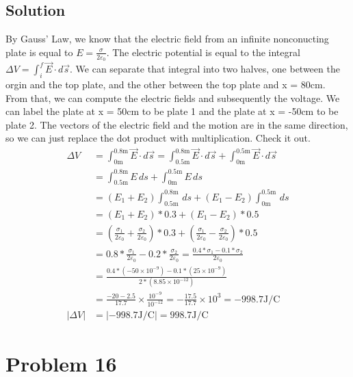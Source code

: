 \documentclass[12pt]{article}
\begin{document}
\subsection*{Solution}
By Gauss' Law, we know that the electric field from an infinite nonconucting plate is equal to $E = \frac{\sigma}{2\varepsilon_0}$.
The electric potential is equal to the integral $\Delta V = \int_{i}^{f} \vec{E}\cdot d\vec{s}$.
We can separate that integral into two halves, one between the orgin and the top plate, and the other between the top plate and x = 80cm.
From that, we can compute the electric fields and subsequently the voltage.
We can label the plate at x = 50cm to be plate 1 and the plate at x = -50cm to be plate 2.
The vectors of the electric field and the motion are in the same direction, so we can just replace the dot product with multiplication.
Check it out.
\begin{align*}
    \Delta V    &=  \int_{0\unit{\meter}}^{0.8\unit{\meter}} \vec{E} \cdot d\vec{s}
        =   \int_{0.5\unit{\meter}}^{0.8\unit{\meter}} \vec{E} \cdot d\vec{s} + \int_{0\unit{\meter}}^{0.5\unit{\meter}} \vec{E} \cdot d\vec{s}\\
        &=  \int_{0.5\unit{\meter}}^{0.8\unit{\meter}} E \,ds + \int_{0\unit{\meter}}^{0.5\unit{\meter}} E \,ds\\
        &=  (E_1 + E_2) \int_{0.5\unit{\meter}}^{0.8\unit{\meter}} \,ds + (E_1 - E_2) \int_{0\unit{\meter}}^{0.5\unit{\meter}} \,ds\\
        &=  (E_1 + E_2)*0.3 + (E_1 - E_2)*0.5\\
        &=  \left(\frac{\sigma_1}{2\varepsilon_0} + \frac{\sigma_2}{2\varepsilon_0}\right)*0.3 + \left(\frac{\sigma_1}{2\varepsilon_0} - \frac{\sigma_2}{2\varepsilon_0}\right)*0.5\\
        &=  0.8*\frac{\sigma_1}{2\varepsilon_0} - 0.2*\frac{\sigma_2}{2\varepsilon_0}
        =   \frac{0.4*\sigma_1 - 0.1*\sigma_2}{2\varepsilon_0}\\
        &=  \frac{0.4*(-50 \times 10^{-9}) - 0.1*(25 \times 10^{-9})}{2*(8.85 \times 10^{-12})}\\
        &=  \frac{-20 - 2.5}{17.7} \times \frac{10^{-9}}{10^{-12}}
        =   -\frac{17.5}{17.7} \times 10^3
        =   -998.7 \unit{\joule/\coulomb}\\
    \left|\Delta V\right|   &=  \left|-998.7 \unit{\joule/\coulomb}\right|
        =   \boxed{998.7 \unit{\joule/\coulomb}}
\end{align*}

\section{Problem 16}
\end{document}
